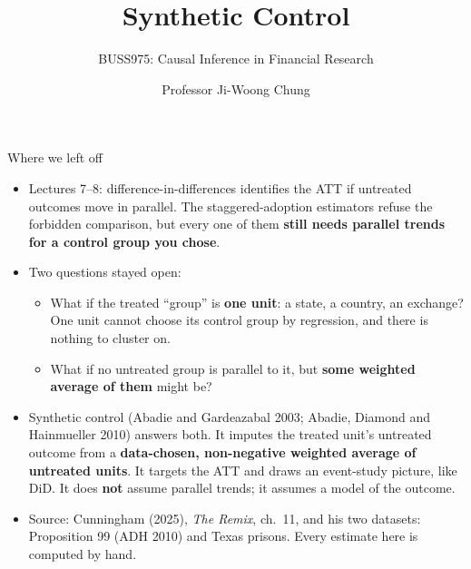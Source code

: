 \documentclass[
  11pt,
  ignorenonframetext,
  aspectratio=169,
]{beamer}
\title{\texorpdfstring{Synthetic Control}{Synthetic Control}}
\subtitle{\texorpdfstring{BUSS975: Causal Inference in Financial
Research}{BUSS975: Causal Inference in Financial Research}}
\author{Professor Ji-Woong Chung}
\date{}
\institute{Korea University}
\providecommand{\tightlist}{%
  \setlength{\itemsep}{0pt}\setlength{\parskip}{0pt}}
\begin{document}
\frame{\titlepage}


\begin{frame}{Where we left off}
\protect{}\label{where-we-left-off}
\begin{itemize}
\tightlist
\item
  Lectures 7--8: difference-in-differences identifies the ATT if
  untreated outcomes move in parallel. The staggered-adoption estimators
  refuse the forbidden comparison, but every one of them \textbf{still
  needs parallel trends for a control group you chose}.
\item
  Two questions stayed open:

  \begin{itemize}
  \tightlist
  \item
    What if the treated ``group'' is \textbf{one unit}: a state, a
    country, an exchange? One unit cannot choose its control group by
    regression, and there is nothing to cluster on.
  \item
    What if no untreated group is parallel to it, but \textbf{some
    weighted average of them} might be?
  \end{itemize}
\end{itemize}

\vspace{0.4em}

\begin{itemize}
\tightlist
\item
  Synthetic control (Abadie and Gardeazabal 2003; Abadie, Diamond and
  Hainmueller 2010) answers both. It imputes the treated unit's
  untreated outcome from a \textbf{data-chosen, non-negative weighted
  average of untreated units}. It targets the ATT and draws an
  event-study picture, like DiD. It does \textbf{not} assume parallel
  trends; it assumes a model of the outcome.
\item
  Source: Cunningham (2025), \emph{The Remix}, ch.~11, and his two
  datasets: Proposition 99 (ADH 2010) and Texas prisons. Every estimate
  here is computed by hand.
\end{itemize}
\end{frame}
\end{document}
